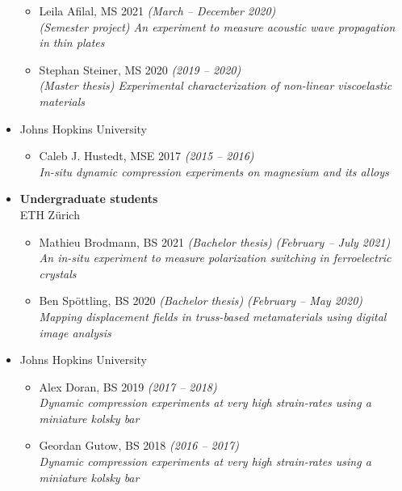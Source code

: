 \documentclass[a4paper,10pt, oneside]{article}
\begin{document}
\begin{itemize}[wide, labelwidth=!, labelindent=-1em]
\begin{itemize}[wide, labelwidth=!, labelindent=0em]
			\item Leila Afilal, MS 2021  \hfill \textit{(March -- December 2020)} \\
			\textit{(Semester project) An experiment to measure acoustic wave propagation in thin plates}
			\item Stephan Steiner, MS 2020  \hfill \textit{(2019 -- 2020)} \\
			\textit{(Master thesis) Experimental characterization of non-linear viscoelastic materials}
		\end{itemize} 
		\vspace*{0.5em}
		\item[]Johns Hopkins University
		\begin{itemize}[wide, labelwidth=!, labelindent=0em]
			\item Caleb J. Hustedt, MSE 2017 \hfill \textit{(2015 -- 2016)} \\
			\textit{In-situ dynamic compression experiments on magnesium and its alloys}
		\end{itemize}
		\vspace*{0.5em}
		\item[]\textbf{Undergraduate students} \\
		ETH Z\"{u}rich
		\begin{itemize}[wide, labelwidth=!, labelindent=0em]
			\item Mathieu Brodmann, BS 2021 \textit{(Bachelor thesis)} \hfill \textit{(February -- July 2021)} \\
			\textit{An in-situ experiment to measure polarization switching in ferroelectric crystals}
			\item Ben Sp\"{o}ttling, BS 2020 \textit{(Bachelor thesis)} \hfill \textit{(February -- May 2020)} \\
			\textit{Mapping displacement fields in truss-based metamaterials using digital image analysis}
		\end{itemize} 
		\vspace*{0.5em}
		\item[]Johns Hopkins University
		\begin{itemize}[wide, labelwidth=!, labelindent=0em]
			\item Alex Doran, BS 2019 \hfill \textit{(2017 -- 2018)} \\
			\textit{Dynamic compression experiments at very high strain-rates using a miniature kolsky bar}
			\item Geordan Gutow, BS 2018 \hfill \textit{(2016 -- 2017)} \\
			\textit{Dynamic compression experiments at very high strain-rates using a miniature kolsky bar}
		\end{itemize}
	\end{itemize}
	
\end{document}
